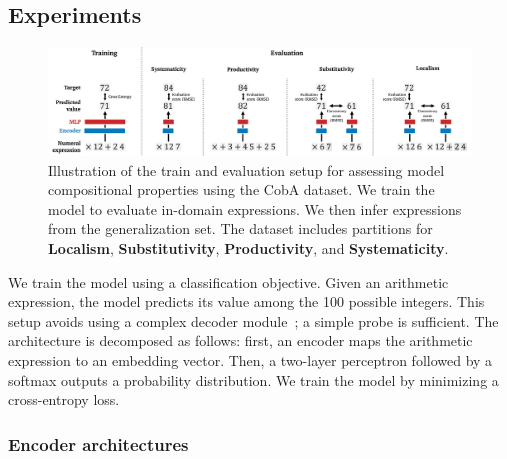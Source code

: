 \subsection{Experiments}

\begin{figure}[htb!]
    \centering
    \includegraphics[width=16cm]{images/compositional_tasks_5.png}
    \caption{Illustration of the train and evaluation setup for assessing model compositional properties using the CobA dataset. We train the model to evaluate in-domain expressions. We then infer expressions from the generalization set. The dataset includes partitions for \textbf{Localism}, \textbf{Substitutivity}, \textbf{Productivity}, and \textbf{Systematicity}.}
    \label{fig:illustration}
\end{figure}


We train the model using a classification objective. Given an arithmetic expression, the model predicts its value among the 100 possible integers. This setup avoids using a complex decoder module~;  a simple probe is sufficient. The architecture is decomposed as follows: first, an encoder maps the arithmetic expression to an embedding vector. Then, a two-layer perceptron followed by a softmax outputs a probability distribution. We train the model by minimizing a cross-entropy loss.

\subsubsection{Encoder architectures}


